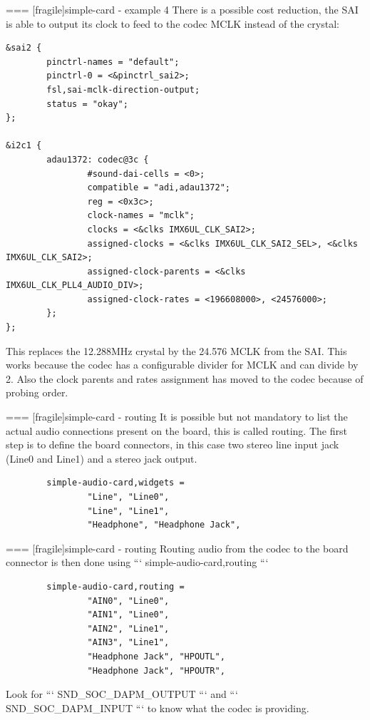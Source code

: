 === [fragile]{simple-card - example 4}
  There is a possible cost reduction, the SAI is able to output its
  clock to feed to the codec MCLK instead of the crystal:
  \begin{block}{}
    \fontsize{7}{6}\selectfont
    \begin{verbatim}
&sai2 {
        pinctrl-names = "default";
        pinctrl-0 = <&pinctrl_sai2>;
        fsl,sai-mclk-direction-output;
        status = "okay";
};

&i2c1 {
        adau1372: codec@3c {
                #sound-dai-cells = <0>;
                compatible = "adi,adau1372";
                reg = <0x3c>;
                clock-names = "mclk";
                clocks = <&clks IMX6UL_CLK_SAI2>;
                assigned-clocks = <&clks IMX6UL_CLK_SAI2_SEL>, <&clks IMX6UL_CLK_SAI2>;
                assigned-clock-parents = <&clks IMX6UL_CLK_PLL4_AUDIO_DIV>;
                assigned-clock-rates = <196608000>, <24576000>;
        };
};
    \end{verbatim}
  \end{block}
  This replaces the 12.288MHz crystal by the 24.576 MCLK from the SAI.
  This works because the codec has a configurable divider for MCLK and
  can divide by 2. Also the clock parents and rates assignment has
  moved to the codec because of probing order.


=== [fragile]{simple-card - routing}
  It is possible but not mandatory to list the actual audio
  connections present on the board, this is called routing.
  The first step is to define the board connectors, in this case two
  stereo line input jack (Line0 and Line1) and a stereo jack output.
  \begin{block}{}
    \fontsize{7}{6}\selectfont
    \begin{verbatim}
        simple-audio-card,widgets =
                "Line", "Line0",
                "Line", "Line1",
                "Headphone", "Headphone Jack",
    \end{verbatim}
  \end{block}


=== [fragile]{simple-card - routing}
  Routing audio from the codec to the board connector is then done
  using ``` simple-audio-card,routing ```
  \begin{block}{}
    \fontsize{7}{6}\selectfont
    \begin{verbatim}
        simple-audio-card,routing =
                "AIN0", "Line0",
                "AIN1", "Line0",
                "AIN2", "Line1",
                "AIN3", "Line1",
                "Headphone Jack", "HPOUTL",
                "Headphone Jack", "HPOUTR",
    \end{verbatim}
  \end{block}
  Look for ``` SND_SOC_DAPM_OUTPUT ``` and ``` SND_SOC_DAPM_INPUT ``` to
  know what the codec is providing.


